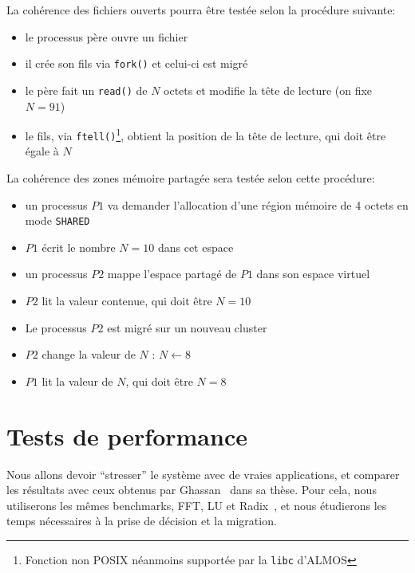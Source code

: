     La cohérence des fichiers ouverts pourra être testée selon la procédure
    suivante:
    \begin{itemize}
      \item le processus père ouvre un fichier
      \item il crée son fils via \texttt{fork()} et celui-ci est migré
      \item le père fait un \texttt{read()} de $N$ octets et modifie la tête de
        lecture (on fixe $N = 91$)
      \item le fils, via \texttt{ftell()}\footnote{Fonction non POSIX néanmoins
        supportée par la \texttt{libc} d'ALMOS}, obtient la position de la tête
        de lecture, qui doit être égale à $N$\\
    \end{itemize}
    La cohérence des zones mémoire partagée sera testée selon cette procédure:
    \begin{itemize}
      \item un processus $P1$ va demander l'allocation d'une région mémoire de 4
        octets en mode \texttt{SHARED}
      \item $P1$ écrit le nombre $N = 10$ dans cet espace 
      \item un processus $P2$ mappe l'espace partagé de $P1$ dans son espace
        virtuel
      \item $P2$ lit la valeur contenue, qui doit être $N = 10$
      \item Le processus $P2$ est migré sur un nouveau cluster
      \item $P2$ change la valeur de $N$ : $N\leftarrow 8$
      \item $P1$ lit la valeur de $N$, qui doit être $N = 8$
    \end{itemize}


  \section{Tests de performance}
  \label{sec:dqdt-test}

    Nous allons devoir ``stresser'' le système avec de vraies applications, et
    comparer les résultats avec ceux obtenus par
    Ghassan~\citeauthor{almaless2014universite} dans sa thèse. Pour cela, nous
    utiliserons les mêmes benchmarks, FFT, LU et Radix~\citep{bailey1989ffts,
      woo1994performance, blelloch1991comparison}, et nous étudierons les temps
    nécessaires à la prise de décision et la migration.


